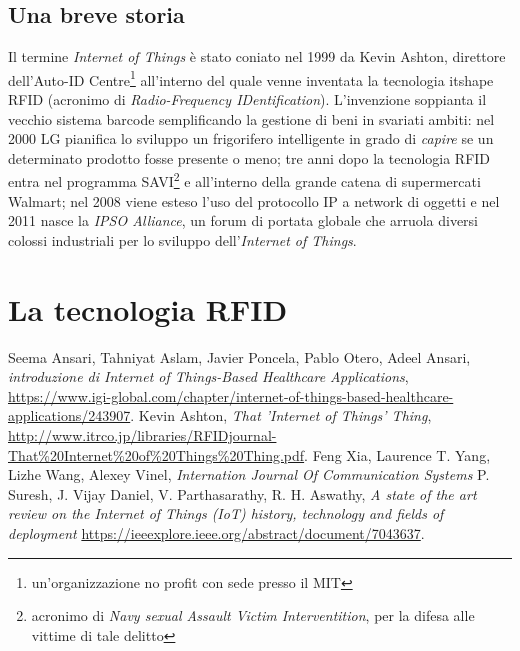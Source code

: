\documentclass[a4paper,titlepage]{report}
\begin{document}
\section{Una breve storia}
Il termine {\itshape Internet of Things} è stato coniato nel 1999 da Kevin Ashton, direttore dell'Auto-ID Centre\footnote{un'organizzazione no profit con sede presso il MIT} all'interno del quale venne inventata la tecnologia itshape RFID (acronimo di {\itshape Radio-Frequency IDentification}). L'invenzione soppianta il vecchio sistema barcode semplificando la gestione di beni in svariati ambiti: nel 2000 LG pianifica lo sviluppo un frigorifero intelligente in grado di {\itshape capire} se un determinato prodotto fosse presente o meno; tre anni dopo la tecnologia RFID entra nel programma SAVI\footnote{acronimo di {\itshape Navy sexual Assault Victim Interventition}, per la difesa alle vittime di tale delitto} e all'interno della grande catena di supermercati Walmart; nel 2008 viene esteso l'uso del protocollo IP a network di oggetti e nel 2011 nasce la {\itshape IPSO Alliance}, un forum di portata globale che arruola diversi colossi industriali per lo sviluppo dell’{\itshape Internet of Things}\cite{Suresh:StateArtReviewIoTHistoryTechnologyFieldsDeployment}.

\chapter{La tecnologia RFID}
\begin{thebibliography}{99}
Seema Ansari, Tahniyat Aslam, Javier Poncela, Pablo Otero, Adeel Ansari,
\emph{introduzione di Internet of Things-Based Healthcare Applications},
\url{https://www.igi-global.com/chapter/internet-of-things-based-healthcare-applications/243907}.
Kevin Ashton,
\emph{That 'Internet of Things' Thing},
\url{http://www.itrco.jp/libraries/RFIDjournal-That%20Internet%20of%20Things%20Thing.pdf}.
Feng Xia, Laurence T. Yang, Lizhe Wang, Alexey Vinel,
\emph{Internation Journal Of Communication Systems}
P. Suresh, J. Vijay Daniel, V. Parthasarathy, R. H. Aswathy,
\emph{A state of the art review on the Internet of Things (IoT) history, technology and fields of deployment}
\url{https://ieeexplore.ieee.org/abstract/document/7043637}.
\end{thebibliography}
\end{document}

